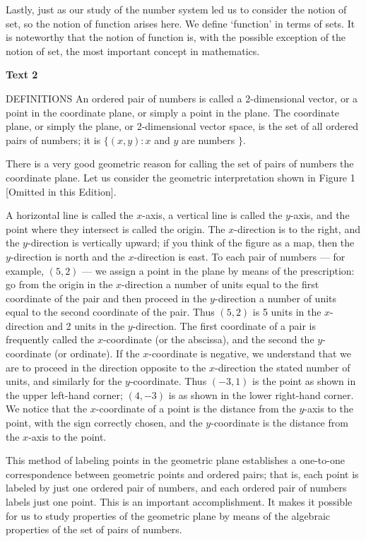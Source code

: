 \documentclass[a4paper]{article}
\newcommand{\ESect}[1]{\medskip\par{\large \textbf{#1}}\par}
\begin{document}
Lastly, just as our study of the number system led us to consider the notion of set, so the notion of function arises here.
We define `function' in terms of sets. It is noteworthy that the notion of function is, with the possible exception of the
notion of set, the most important concept in mathematics.

\ESect{Text 2}

DEFINITIONS An ordered pair of numbers is called a 2-dimensional vector, or a point in the coordinate plane, or simply a point in
the plane. The coordinate plane, or simply the plane, or 2-dimensional vector space, is the set of all ordered pairs of numbers;
it is $\{(x, y) : x$ and $y$ are numbers $\}$.

There is a very good geometric reason for calling the set of pairs
of numbers the coordinate plane. Let us consider the geometric
interpretation shown in Figure 1 [Omitted in this Edition].

A horizontal line is called the $x$-axis, a vertical line is called the $y$-axis, and the point where they intersect is called
the origin. The $x$-direction is to the right, and the $y$-direction is vertically upward; if you think of the figure as a map,
then the $y$-direction is north and the $x$-direction is east. To each pair of numbers --- for example, $(5, 2)$ --- we assign
a point in the plane by means of the prescription: go from the origin in the $x$-direction a number of units equal to the first
coordinate of the pair and then proceed in the $y$-direction a number of units equal to the second coordinate of the pair.
Thus $(5, 2)$ is 5 units in the $x$-direction and 2 units in the $y$-direction. The first coordinate of a pair is frequently
called the $x$-coordinate (or the abscissa), and the second the $y$-coordinate (or ordinate). If the $x$-coordinate is negative,
we understand that we are to proceed in the direction opposite to the $x$-direction the stated number of units, and similarly
for the $y$-coordinate. Thus $(-3,1)$ is the point as shown in the upper left-hand corner; $(4, -3)$ is as shown in the lower
right-hand corner. We notice that the $x$-coordinate of a point is the distance from the $y$-axis to the point, with the sign
correctly chosen, and the $y$-coordinate is the distance from the $x$-axis to the point.

This method of labeling points in the geometric plane establishes a one-to-one correspondence between geometric points and ordered
pairs; that is, each point is labeled by just one ordered pair of numbers, and each ordered pair of numbers labels just one point.
This is an important accomplishment. It makes it possible for us to study properties of the geometric plane by means of the algebraic
properties of the set of pairs of numbers.
\end{document}
